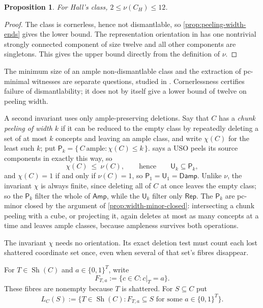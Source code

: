 \documentclass[11pt]{article}
\newtheorem{proposition}{Proposition}[section]
\theoremstyle{definition}
\newcommand{\Amp}{\mathsf{Amp}}
\newcommand{\Damp}{\mathsf{Damp}}
\newcommand{\Rep}{\mathsf{Rep}}
\newcommand{\Sh}{\operatorname{Sh}}
\begin{document}
\begin{proposition}\label{prop:hall-width}
For Hall's class, $2\le\nu(C_H)\le12$.
\end{proposition}
\begin{proof}
The class is cornerless, hence not dismantlable, so
\cref{prop:peeling-width-ends} gives the lower bound.
The representation orientation in \cite[Fig.~6]{CCMW} has one nontrivial
strongly connected component of size twelve and all other components are
singletons. This gives the upper bound directly from the definition of $\nu$.
\end{proof}

The minimum size of an ample non-dismantlable class and the extraction of
pc-minimal witnesses are separate questions, studied in
\cite{AmpleCampaign}. Cornerlessness certifies failure of dismantlability;
it does not by itself give a lower bound of twelve on peeling width.

A second invariant uses only ample-preserving deletions. Say that $C$ has a
\emph{chunk peeling of width $k$} if it can be reduced to the empty class by
repeatedly deleting a set of at most $k$ concepts and leaving an ample class, and
write $\chi(C)$ for the least such $k$; put
$\mathsf{P}_{k}=\{\,C\ \text{ample}:\chi(C)\le k\,\}$.
 says a USO peels its source components in exactly
this way, so
\[
  \chi(C)\ \le\ \nu(C),
  \qquad\text{hence}\qquad
  \mathsf{U}_{k}\subseteq\mathsf{P}_{k},
\]
and $\chi(C)=1$ if and only if $\nu(C)=1$, so
$\mathsf{P}_{1}=\mathsf{U}_{1}=\Damp$. Unlike $\nu$, the invariant $\chi$ is
always finite, since deleting all of $C$ at once leaves the empty class; so the
$\mathsf{P}_{k}$ filter the whole of $\Amp$, while the $\mathsf{U}_{k}$ filter
only $\Rep$. The $\mathsf{P}_{k}$ are pc-minor closed by the argument of
\cref{prop:width-minor-closed}: intersecting a chunk peeling with a cube, or
projecting it, again deletes at most as many concepts at a time and leaves ample
classes, because ampleness survives both operations.

The invariant $\chi$ needs no orientation. Its exact deletion test must
count each lost shattered coordinate set once, even when several of that
set's fibres disappear.

For $T\in\Sh(C)$ and $a\in\{0,1\}^{T}$, write
\[
 F_{T,a}:=\{c\in C:c|_T=a\}.
\]
These fibres are nonempty because $T$ is shattered. For $S\subseteq C$ put
\[
 L_C(S):=\{T\in\Sh(C): F_{T,a}\subseteq S
                 \text{ for some }a\in\{0,1\}^{T}\}.
\]
\end{document}
